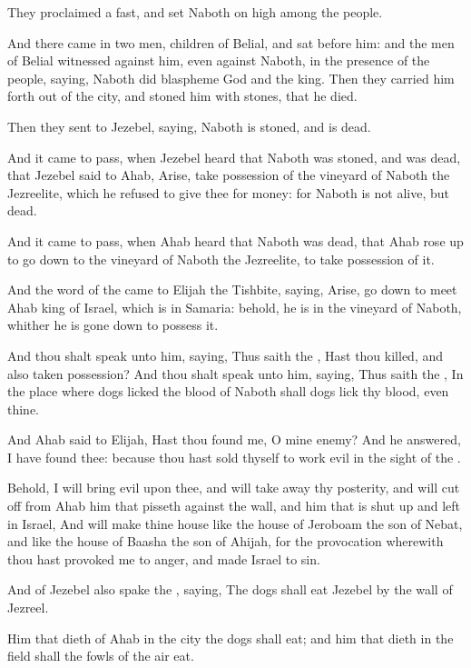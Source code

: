 \Verse They proclaimed a fast, and set Naboth on high among the people.

\Verse And there came in two men, children of Belial, and sat before him: and the men of Belial witnessed against him, even against Naboth, in the presence of the people, saying, Naboth did blaspheme God and the king. Then they carried him forth out of the city, and stoned him with stones, that he died.

\Verse Then they sent to Jezebel, saying, Naboth is stoned, and is dead.

\Verse And it came to pass, when Jezebel heard that Naboth was stoned, and was dead, that Jezebel said to Ahab, Arise, take possession of the vineyard of Naboth the Jezreelite, which he refused to give thee for money: for Naboth is not alive, but dead.

\Verse And it came to pass, when Ahab heard that Naboth was dead, that Ahab rose up to go down to the vineyard of Naboth the Jezreelite, to take possession of it.

\Verse And the word of the \LORD came to Elijah the Tishbite, saying, \Verse Arise, go down to meet Ahab king of Israel, which is in Samaria: behold, he is in the vineyard of Naboth, whither he is gone down to possess it.

\Verse And thou shalt speak unto him, saying, Thus saith the \LORD, Hast thou killed, and also taken possession? And thou shalt speak unto him, saying, Thus saith the \LORD, In the place where dogs licked the blood of Naboth shall dogs lick thy blood, even thine.

\Verse And Ahab said to Elijah, Hast thou found me, O mine enemy? And he answered, I have found thee: because thou hast sold thyself to work evil in the sight of the \LORD.

\Verse Behold, I will bring evil upon thee, and will take away thy posterity, and will cut off from Ahab him that pisseth against the wall, and him that is shut up and left in Israel, \Verse And will make thine house like the house of Jeroboam the son of Nebat, and like the house of Baasha the son of Ahijah, for the provocation wherewith thou hast provoked me to anger, and made Israel to sin.

\Verse And of Jezebel also spake the \LORD, saying, The dogs shall eat Jezebel by the wall of Jezreel.

\Verse Him that dieth of Ahab in the city the dogs shall eat; and him that dieth in the field shall the fowls of the air eat.


